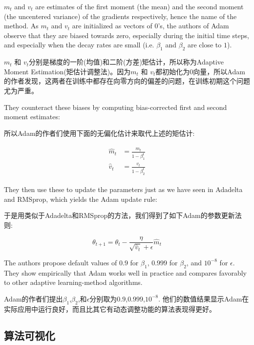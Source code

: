 \documentclass{article}
\begin{document}
$m_t$ and $v_t$ are estimates of the first moment (the mean) and the second moment (the uncentered variance) of the gradients respectively, hence the name of the method. As $m_t$ and $v_t$ are initialized as vectors of $0$'s, the authors of Adam observe that they are biased towards zero, especially during the initial time steps, and especially when the decay rates are small (i.e. $\beta_1$ and $\beta_2$ are close to $1$). 

$m_t$ 和 $v_t$分别是梯度的一阶(均值)和二阶(方差)矩估计，所以称为Adaptive Moment Estimation(矩估计调整法)。因为$m_t$ 和 $v_t$都初始化为$0$向量，所以Adam的作者发现，这两者在训练中都存在向零方向的偏差的问题，在训练初期这个问题尤为严重。

They counteract these biases by computing bias-corrected first and second moment estimates:

所以Adam的作者们使用下面的无偏化估计来取代上述的矩估计:

\begin{align}
\begin{split}
\hat{m}_t &= \frac{m_t}{1 - \beta^t_1}\\
\hat{v}_t &= \frac{v_t}{1 - \beta^t_2}
\end{split}
\end{align}

They then use these to update the parameters just as we have seen in Adadelta and RMSprop, which yields the Adam update rule:

于是用类似于Adadelta和RMSprop的方法，我们得到了如下Adam的参数更新法则:

\begin{equation}
\theta_{t+1} = \theta_{t} - \frac{\eta}{\sqrt{\hat{v}_t} + \epsilon} \hat{m}_t
\end{equation}

The authors propose default values of $0.9$ for $\beta_1$, $0.999$ for $\beta_2$, and $10^{-8}$ for $\epsilon$. They show empirically that Adam works well in practice and compares favorably to other adaptive learning-method algorithms.

Adam的作者们提出$\beta_1$,$\beta_2$,和$\epsilon$分别取为$0.9$,$0.999$,$10^{-8}$. 他们的数值结果显示Adam在实际应用中运行良好，而且比其它有动态调整功能的算法表现得更好。

\subsection{算法可视化}
\end{document}
